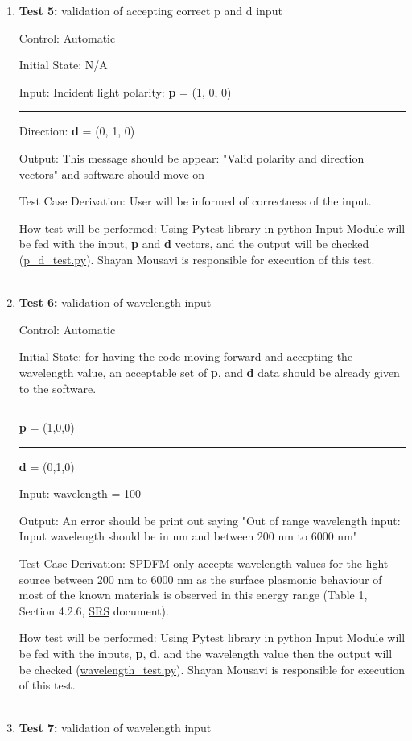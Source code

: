 \documentclass[12pt, titlepage]{article}
\begin{document}
\begin{enumerate}
\item{\textbf{Test 5:} validation of accepting correct p and d input\\}

Control: Automatic

Initial State: N/A

Input: Incident light polarity: \textbf{p} = (1, 0, 0)\\
\rule{1.15cm}{0pt} Direction: \textbf{d} = (0, 1, 0)

Output: This message should be appear: "Valid polarity and direction vectors" and software should move on

Test Case Derivation: User will be informed of correctness of the input.

How test will be performed: Using Pytest library in python Input Module will be fed with the input, \textbf{p} and \textbf{d} vectors, and the output will be checked (\href{https://github.com/shmouses/SPDFM/tree/master/src}{p\_d\_test.py}). Shayan Mousavi is responsible for execution of this test.
\\
\\

\item{\textbf{Test 6:} validation of wavelength input\\}

Control: Automatic

Initial State: for having the code moving forward and accepting the wavelength value, an acceptable set of \textbf{p}, and \textbf{d} data should be already given to the software.\\ 
\rule{2.3cm}{0pt} \textbf{p} = (1,0,0)\\
\rule{2.3cm}{0pt} \textbf{d} = (0,1,0)

Input: wavelength = 100

Output: An error should be print out saying "Out of range wavelength input: Input wavelength should be in nm and between 200 nm to 6000 nm" 

Test Case Derivation: SPDFM only accepts wavelength values for the light source between 200 nm to 6000 nm as the surface plasmonic behaviour of most of the known materials is observed in this energy range (Table 1, Section 4.2.6, \href{https://github.com/shmouses/SPDFM/tree/master/doc/SRS}{SRS} document). 

How test will be performed: Using Pytest library in python Input Module will be fed with the inputs, \textbf{p}, \textbf{d}, and the wavelength value then the output will be checked (\href{https://github.com/shmouses/SPDFM/tree/master/src}{wavelength\_test.py}). Shayan Mousavi is responsible for execution of this test.
\\
\\
\item{\textbf{Test 7:} validation of wavelength input\\}


\end{enumerate}
\end{document}
